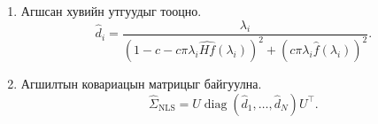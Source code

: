\begin{enumerate}
	\item Агшсан хувийн утгуудыг
	тооцно.
	\[
	\widehat{d}_i
	=
	\frac{\lambda_i}
	{
		\left(
		1-c-c\pi\lambda_i
		\widehat{Hf}(\lambda_i)
		\right)^2
		+
		\left(
		c\pi\lambda_i
		\widehat{f}(\lambda_i)
		\right)^2
	}.
	\]
	
	\item Агшилтын ковариацын матрицыг
	байгуулна.
	\[
	\widehat{\Sigma}_{\mathrm{NLS}}
	=
	U
	\operatorname{diag}
	(\widehat{d}_1,\ldots,\widehat{d}_N)
	U^{\top}.
	\]
	
\end{enumerate}

